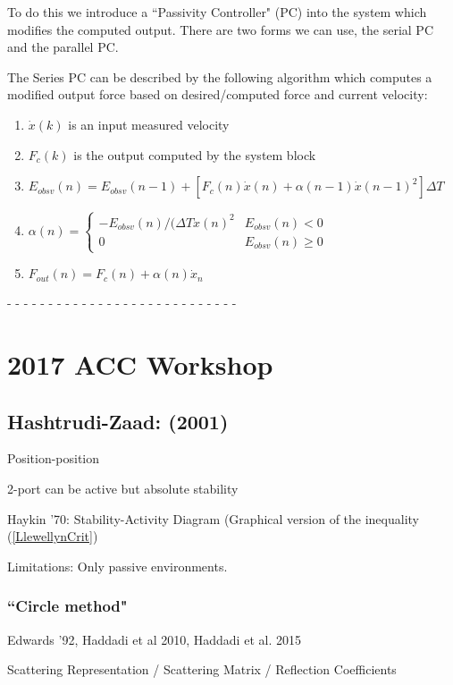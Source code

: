 \documentclass[letterpaper]{article}
\begin{document}
To do this we introduce a ``Passivity Controller" (PC) into the system which modifies the computed output.  There are two forms we can use, the serial PC and the parallel PC. 

The Series PC can be described by the following algorithm which computes a modified output force 
based on desired/computed force and current velocity:
\begin{enumerate}
    \item $\dot{x}(k)$ is an input measured velocity
    \item $F_c(k)$ is the output computed by the system block
    \item $E_{obsv}(n) = E_{obsv}(n-1)+[F_c(n)\dot{x}(n)+\alpha(n-1)\dot{x}(n-1)^2]\Delta T$
    \item  
    $\alpha(n) = \begin{cases} 
       -E_{obsv}(n)/(\Delta T\dot{x}(n)^2 & E_{obsv}(n) < 0 \\
       0                                 & E_{obsv}(n) \geq 0
       \end{cases}
       $
    \item $F_{out}(n) = F_c(n)+\alpha(n)\dot{x}_n$
\end{enumerate}


- - - - - - - - - - - - - - - - - - - - - - - - - - - - 

\section{2017 ACC Workshop}
\subsection{Hashtrudi-Zaad: (2001)}

Position-position

2-port can be active but absolute stability 

Haykin '70:    Stability-Activity Diagram  (Graphical version of the inequality (\ref{LlewellynCrit})

Limitations:   Only passive environments.  

\subsubsection{``Circle method"}  Edwards '92, Haddadi et al 2010, Haddadi et al. 2015

Scattering Representation / Scattering Matrix  /  Reflection Coefficients
\end{document}
